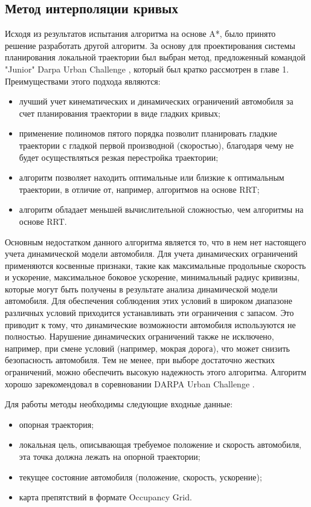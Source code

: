 \subsection{Метод интерполяции кривых}
Исходя из результатов испытания алгоритма на основе A*, было принято решение разработать другой алгоритм. За основу для
проектирования системы планирования локальной траектории был выбран метод, предложенный командой "Junior" Darpa
Urban Challenge \cite{darpa_junior}, который был кратко рассмотрен в главе 1. Преимуществами этого подхода
являются:
\begin{itemize}
      \item лучший учет кинематических и динамических ограничений автомобиля за счет планирования траектории в
            виде гладких кривых;
      \item применение полиномов пятого порядка позволит планировать гладкие траектории с гладкой первой производной
            (скоростью), благодаря чему не будет осуществляться резкая перестройка траектории;
      \item алгоритм позволяет находить оптимальные или близкие к оптимальным траектории, в отличие от, например,
            алгоритмов на основе RRT;
      \item алгоритм обладает меньшей вычислительной сложностью, чем алгоритмы на основе RRT.
\end{itemize}

Основным недостатком данного алгоритма является то, что в нем нет настоящего учета динамической модели автомобиля.
Для учета динамических ограничений применяются косвенные признаки, такие как максимальные продольные скорость и ускорение,
максимальное боковое ускорение, минимальный радиус кривизны, которые могут быть получены в результате анализа динамической
модели автомобиля. Для обеспечения соблюдения этих условий в широком диапазоне различных условий приходится устанавливать
эти ограничения с запасом. Это приводит к тому, что динамические возможности автомобиля используются не полностью.
Нарушение динамических ограничений также не исключено, например, при смене условий (например, мокрая дорога), что
может снизить безопасность автомобиля. Тем не менее, при выборе достаточно жестких ограничений, можно обеспечить
высокую надежность этого алгоритма. Алгоритм хорошо зарекомендовал в соревновании DARPA Urban Challenge \cite{darpa_junior}.

Для работы методы необходимы следующие входные данные:
\begin{itemize}
      \item опорная траектория;
      \item локальная цель, описывающая требуемое положение и скорость автомобиля, эта точка должна
            лежать на опорной траектории;
      \item текущее состояние автомобиля (положение, скорость, ускорение);
      \item карта препятствий в формате Occupancy Grid.
\end{itemize}

